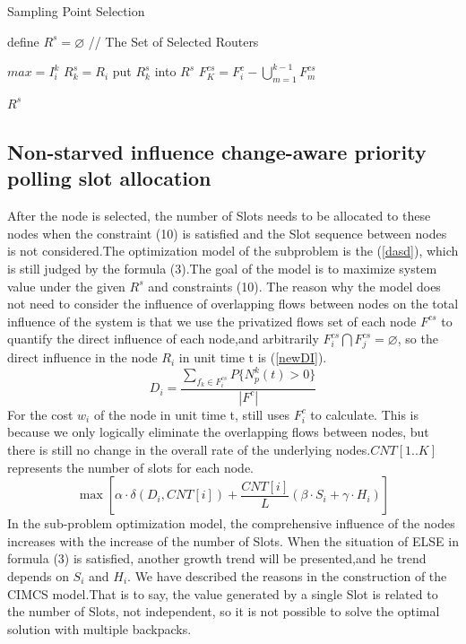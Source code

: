 \documentclass[conference]{IEEEtran}
\begin{document}
\begin{algorithm}[h]
\caption{Sampling Point Selection}
\begin{algorithmic}[1]

\STATE define $R^s=\varnothing$  //  The Set of Selected Routers


\STATE $max = I_i^k$
\STATE $R^s_k = R_i$
\ENDIF
\ENDFOR
\STATE put $R^s_k$ into $R^s$
\STATE $F_K^{cs} = F_i^c- \bigcup_{m=1}^{k-1}F_m^{cs}$ 
\ENDFOR

\RETURN $R^s$
\label{code:recentEnd}
\end{algorithmic}
\end{algorithm}


 


\subsection{Non-starved influence change-aware priority polling slot allocation}

After the node is selected, the number of Slots needs to be allocated to these nodes when the constraint (10) is satisfied and the Slot sequence between nodes is not considered.The optimization model of the subproblem is the (\ref{dasd}), which is still judged by the formula (3).The goal of the model is to maximize system value under the given $R^s$ and constraints (10). The reason why the model does not need to consider the influence of overlapping flows between nodes on the total influence of the system is that we use the privatized flows set of each node $F^{cs}$ to quantify the direct influence of each node,and arbitrarily $F^{cs}_i \bigcap F^{cs}_j = \varnothing$, so the direct influence in the node $R_i$ in unit time t is (\ref{newDI}).
\begin{equation}
{D}_i=\frac{\sum_{f_k \in F^{cs}_i} P\{N_p^k(t)> 0\}}{|F^c|} 
\label{newDI}
\end{equation}
For the cost $w_i$ of the node in unit time t, still uses $F_i^c$ to calculate. This is because we only logically eliminate the overlapping flows between nodes, but there is still no change in the overall rate of the underlying nodes.$CNT[1..K]$ represents the number of slots for each node.
\begin{equation}
\max [ \alpha \cdot \delta(D_i,CNT[i]) + \frac{CNT[i]}{L}(\beta \cdot S_i + \gamma \cdot H_i)  ]
\label{dasd}
\end{equation}
In the sub-problem optimization model, the comprehensive influence of the nodes increases with the increase of the number of Slots. When the situation of ELSE in formula (3) is satisfied, another growth trend will be presented,and he trend depends on $S_i$ and $H_i$. We have described the reasons in the construction of the CIMCS model.That is to say, the value generated by a single Slot is related to the number of Slots, not independent, so it is not possible to solve the optimal solution with multiple backpacks.
\end{document}
